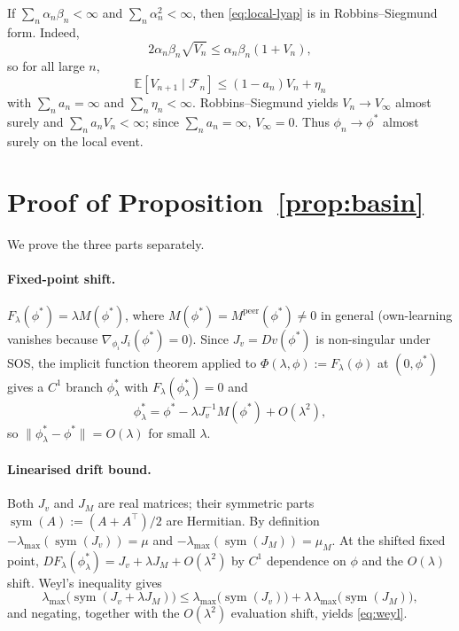 \documentclass{article}
\theoremstyle{plain}
\theoremstyle{definition}
\theoremstyle{remark}
\newcommand{\E}{\mathbb{E}}
\newcommand{\F}{\mathcal{F}}
\begin{document}
If $\sum_n\alpha_n\beta_n<\infty$ and $\sum_n\alpha_n^2<\infty$, then \eqref{eq:local-lyap} is in Robbins--Siegmund form. Indeed,
\[
2\alpha_n\beta_n\sqrt{V_n}\le \alpha_n\beta_n(1+V_n),
\]
so for all large $n$,
\[
\E[V_{n+1}\mid\F_n]\le (1-a_n)V_n+\eta_n
\]
with $\sum_n a_n=\infty$ and $\sum_n\eta_n<\infty$. Robbins--Siegmund yields $V_n\to V_\infty$ almost surely and $\sum_n a_nV_n<\infty$; since $\sum_n a_n=\infty$, $V_\infty=0$. Thus $\phi_n\to\phi^\ast$ almost surely on the local event.

\section{Proof of Proposition~\ref{prop:basin}}\label{app:prop-basin}

We prove the three parts separately.

\paragraph{Fixed-point shift.}
$F_\lambda(\phi^\ast)=\lambda M(\phi^\ast)$, where $M(\phi^\ast)=M^{\mathrm{peer}}(\phi^\ast)\ne0$ in general (own-learning vanishes because $\nabla_{\phi_i}J_i(\phi^\ast)=0$). Since $J_v=Dv(\phi^\ast)$ is non-singular under SOS, the implicit function theorem applied to $\Phi(\lambda,\phi):=F_\lambda(\phi)$ at $(0,\phi^\ast)$ gives a $C^1$ branch $\phi^\ast_\lambda$ with $F_\lambda(\phi^\ast_\lambda)=0$ and
\[
\phi^\ast_\lambda=\phi^\ast-\lambda J_v^{-1}M(\phi^\ast)+O(\lambda^2),
\]
so $\|\phi^\ast_\lambda-\phi^\ast\|=O(\lambda)$ for small $\lambda$.

\paragraph{Linearised drift bound.}
Both $J_v$ and $J_M$ are real matrices; their symmetric parts $\operatorname{sym}(A):=(A+A^\top)/2$ are Hermitian. By definition $-\lambda_{\max}(\operatorname{sym}(J_v))=\mu$ and $-\lambda_{\max}(\operatorname{sym}(J_M))=\mu_M$. At the shifted fixed point, $DF_\lambda(\phi^\ast_\lambda)=J_v+\lambda J_M+O(\lambda^2)$ by $C^1$ dependence on $\phi$ and the $O(\lambda)$ shift. Weyl's inequality gives
\[
\lambda_{\max}\!\bigl(\operatorname{sym}(J_v+\lambda J_M)\bigr)\le \lambda_{\max}\!\bigl(\operatorname{sym}(J_v)\bigr)+\lambda\,\lambda_{\max}\!\bigl(\operatorname{sym}(J_M)\bigr),
\]
and negating, together with the $O(\lambda^2)$ evaluation shift, yields \eqref{eq:weyl}.
\end{document}

